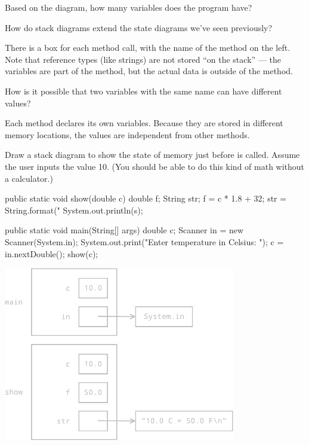 \Q Based on the diagram, how many variables does the program have? 
\vspace{1em}


\Q How do stack diagrams extend the state diagrams we've seen previously?

\begin{answer}[5em]
There is a box for each method call, with the name of the method on the left.
Note that reference types (like strings) are not stored ``on the stack'' --- the variables are part of the method, but the actual data is outside of the method.
\end{answer}


\Q How is it possible that two variables with the same name can have different values?

\begin{answer}
Each method declares its own variables.
Because they are stored in different memory locations, the values are independent from other methods.
\end{answer}


\Q Draw a stack diagram to show the state of memory just before  is called.
Assume the user inputs the value 10.
(You should be able to do this kind of math without a calculator.)

\vspace{1ex}
\begin{javalst}
    public static void show(double c) {
        double f;
        String str;
        f = c * 1.8 + 32;
        str = String.format("%
        System.out.println(s);
    }

    public static void main(String[] args) {
        double c;
        Scanner in = new Scanner(System.in);
        System.out.print("Enter temperature in Celsius: ");
        c = in.nextDouble();
        show(c);
    }
\end{javalst}
\vspace{-1ex}

\begin{answer}[3.1in]
\hfill
\includegraphics[height=3in]{CS1/stack2.pdf}
\end{answer}


